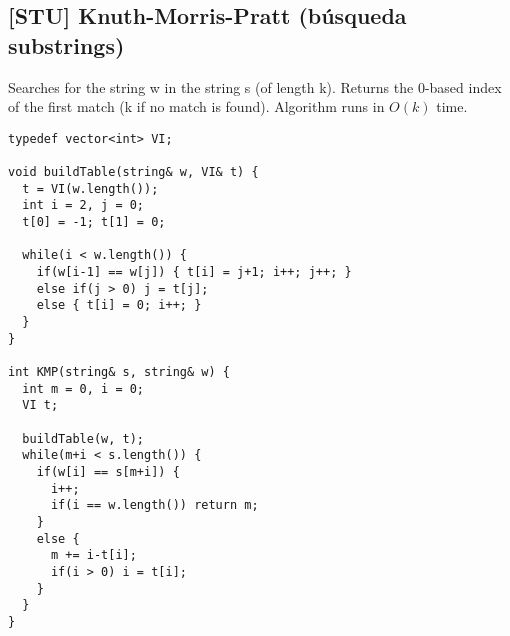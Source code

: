 \documentclass[10pt, a4, oneside]{article}
\begin{document}
\subsection{[STU] Knuth-Morris-Pratt (búsqueda substrings)}
Searches for the string w in the string s (of length k). Returns the
0-based index of the first match (k if no match is found). Algorithm
runs in $O(k)$ time.
\begin{verbatim}
typedef vector<int> VI;

void buildTable(string& w, VI& t) {
  t = VI(w.length());  
  int i = 2, j = 0;
  t[0] = -1; t[1] = 0;
  
  while(i < w.length()) {
    if(w[i-1] == w[j]) { t[i] = j+1; i++; j++; }
    else if(j > 0) j = t[j];
    else { t[i] = 0; i++; }
  }
}

int KMP(string& s, string& w) {
  int m = 0, i = 0;
  VI t;
  
  buildTable(w, t);  
  while(m+i < s.length()) {
    if(w[i] == s[m+i]) {
      i++;
      if(i == w.length()) return m;
    }
    else {
      m += i-t[i];
      if(i > 0) i = t[i];
    }
  }  
}
\end{verbatim}
\end{document}
